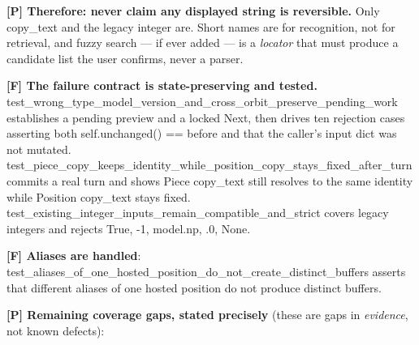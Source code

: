 \documentclass[10pt,a4paper]{article}
\begin{document}
\textbf{{[}P{]} Therefore: never claim any displayed string is reversible.} Only {\codefont copy\_\allowbreak{}text} and the legacy integer are. Short names are for recognition, not for retrieval, and fuzzy search --- if ever added --- is a \emph{locator} that must produce a candidate list the user confirms, never a parser.

\textbf{{[}F{]} The failure contract is state-preserving and tested.} {\codefont test\_\allowbreak{}wrong\_\allowbreak{}type\_\allowbreak{}model\_\allowbreak{}version\_\allowbreak{}and\_\allowbreak{}cross\_\allowbreak{}orbit\_\allowbreak{}preserve\_\allowbreak{}pending\_\allowbreak{}work} establishes a pending preview and a locked Next, then drives ten rejection cases asserting both {\codefont self.\allowbreak{}unchanged() == \allowbreak{}before} and that the caller's input dict was not mutated. {\codefont test\_\allowbreak{}piece\_\allowbreak{}copy\_\allowbreak{}keeps\_\allowbreak{}identity\_\allowbreak{}while\_\allowbreak{}position\_\allowbreak{}copy\_\allowbreak{}stays\_\allowbreak{}fixed\_\allowbreak{}after\_\allowbreak{}turn} commits a real turn and shows Piece copy\_text still resolves to the same identity while Position copy\_text stays fixed. {\codefont test\_\allowbreak{}existing\_\allowbreak{}integer\_\allowbreak{}inputs\_\allowbreak{}remain\_\allowbreak{}compatible\_\allowbreak{}and\_\allowbreak{}strict} covers legacy integers and rejects {\codefont True}, {\codefont -\allowbreak{}1}, {\codefont model.\allowbreak{}np}, {.\allowbreak{}0}, {\codefont None}.

\textbf{{[}F{]} Aliases are handled}: {\codefont test\_\allowbreak{}aliases\_\allowbreak{}of\_\allowbreak{}one\_\allowbreak{}hosted\_\allowbreak{}position\_\allowbreak{}do\_\allowbreak{}not\_\allowbreak{}create\_\allowbreak{}distinct\_\allowbreak{}buffers} asserts that different aliases of one hosted position do not produce distinct buffers.

\textbf{{[}P{]} Remaining coverage gaps, stated precisely} (these are gaps in \emph{evidence}, not known defects):
\end{document}
